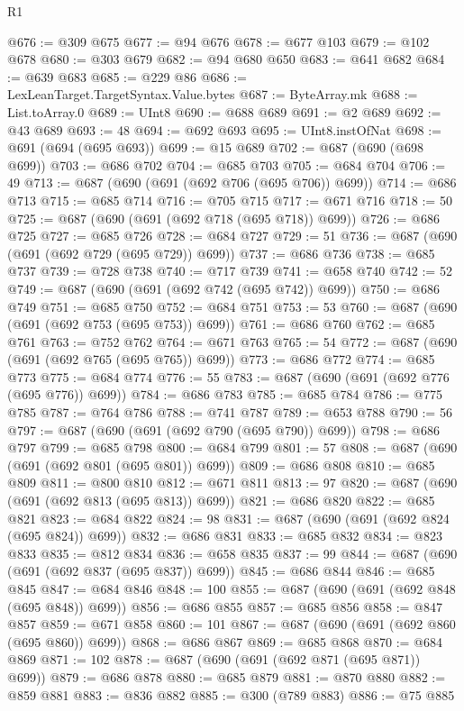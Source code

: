 \begin{lexlean}{R1}
\begin{coremodule}
@676 := @309 @675
@677 := @94 @676
@678 := @677 @103
@679 := @102 @678
@680 := @303 @679
@682 := @94 @680 @650
@683 := @641 @682
@684 := @639 @683
@685 := @229 @86
@686 := LexLeanTarget.TargetSyntax.Value.bytes
@687 := ByteArray.mk
@688 := List.toArray.{0}
@689 := UInt8
@690 := @688 @689
@691 := @2 @689
@692 := @43 @689
@693 := 48
@694 := @692 @693
@695 := UInt8.instOfNat
@698 := @691 (@694 (@695 @693))
@699 := @15 @689
@702 := @687 (@690 (@698 @699))
@703 := @686 @702
@704 := @685 @703
@705 := @684 @704
@706 := 49
@713 := @687 (@690 (@691 (@692 @706 (@695 @706)) @699))
@714 := @686 @713
@715 := @685 @714
@716 := @705 @715
@717 := @671 @716
@718 := 50
@725 := @687 (@690 (@691 (@692 @718 (@695 @718)) @699))
@726 := @686 @725
@727 := @685 @726
@728 := @684 @727
@729 := 51
@736 := @687 (@690 (@691 (@692 @729 (@695 @729)) @699))
@737 := @686 @736
@738 := @685 @737
@739 := @728 @738
@740 := @717 @739
@741 := @658 @740
@742 := 52
@749 := @687 (@690 (@691 (@692 @742 (@695 @742)) @699))
@750 := @686 @749
@751 := @685 @750
@752 := @684 @751
@753 := 53
@760 := @687 (@690 (@691 (@692 @753 (@695 @753)) @699))
@761 := @686 @760
@762 := @685 @761
@763 := @752 @762
@764 := @671 @763
@765 := 54
@772 := @687 (@690 (@691 (@692 @765 (@695 @765)) @699))
@773 := @686 @772
@774 := @685 @773
@775 := @684 @774
@776 := 55
@783 := @687 (@690 (@691 (@692 @776 (@695 @776)) @699))
@784 := @686 @783
@785 := @685 @784
@786 := @775 @785
@787 := @764 @786
@788 := @741 @787
@789 := @653 @788
@790 := 56
@797 := @687 (@690 (@691 (@692 @790 (@695 @790)) @699))
@798 := @686 @797
@799 := @685 @798
@800 := @684 @799
@801 := 57
@808 := @687 (@690 (@691 (@692 @801 (@695 @801)) @699))
@809 := @686 @808
@810 := @685 @809
@811 := @800 @810
@812 := @671 @811
@813 := 97
@820 := @687 (@690 (@691 (@692 @813 (@695 @813)) @699))
@821 := @686 @820
@822 := @685 @821
@823 := @684 @822
@824 := 98
@831 := @687 (@690 (@691 (@692 @824 (@695 @824)) @699))
@832 := @686 @831
@833 := @685 @832
@834 := @823 @833
@835 := @812 @834
@836 := @658 @835
@837 := 99
@844 := @687 (@690 (@691 (@692 @837 (@695 @837)) @699))
@845 := @686 @844
@846 := @685 @845
@847 := @684 @846
@848 := 100
@855 := @687 (@690 (@691 (@692 @848 (@695 @848)) @699))
@856 := @686 @855
@857 := @685 @856
@858 := @847 @857
@859 := @671 @858
@860 := 101
@867 := @687 (@690 (@691 (@692 @860 (@695 @860)) @699))
@868 := @686 @867
@869 := @685 @868
@870 := @684 @869
@871 := 102
@878 := @687 (@690 (@691 (@692 @871 (@695 @871)) @699))
@879 := @686 @878
@880 := @685 @879
@881 := @870 @880
@882 := @859 @881
@883 := @836 @882
@885 := @300 (@789 @883)
@886 := @75 @885

\end{coremodule}
\end{lexlean}
